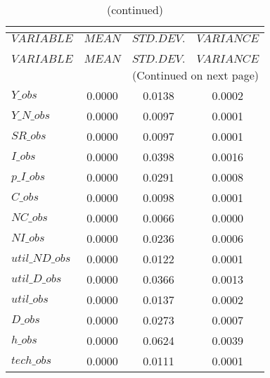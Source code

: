  
\begin{center}
\begin{longtable}{lccc} 
\caption{THEORETICAL MOMENTS}\\
 \label{Table:th_moments}\\
\toprule 
$VARIABLE       $	 & 	 $         MEAN$	 & 	 $    STD. DEV.$	 & 	 $     VARIANCE$\\
\midrule \endfirsthead 
\caption{(continued)}\\
 \toprule \\ 
$VARIABLE       $	 & 	 $         MEAN$	 & 	 $    STD. DEV.$	 & 	 $     VARIANCE$\\
\midrule \endhead 
\midrule \multicolumn{4}{r}{(Continued on next page)} \\ \bottomrule \endfoot 
\bottomrule \endlastfoot 
$Y\_obs         $	 & 	       0.0000	 & 	       0.0138	 & 	       0.0002 \\ 
$Y\_N\_obs      $	 & 	       0.0000	 & 	       0.0097	 & 	       0.0001 \\ 
$SR\_obs        $	 & 	       0.0000	 & 	       0.0097	 & 	       0.0001 \\ 
$I\_obs         $	 & 	       0.0000	 & 	       0.0398	 & 	       0.0016 \\ 
$p\_I\_obs      $	 & 	       0.0000	 & 	       0.0291	 & 	       0.0008 \\ 
$C\_obs         $	 & 	       0.0000	 & 	       0.0098	 & 	       0.0001 \\ 
$NC\_obs        $	 & 	       0.0000	 & 	       0.0066	 & 	       0.0000 \\ 
$NI\_obs        $	 & 	       0.0000	 & 	       0.0236	 & 	       0.0006 \\ 
$util\_ND\_obs  $	 & 	       0.0000	 & 	       0.0122	 & 	       0.0001 \\ 
$util\_D\_obs   $	 & 	       0.0000	 & 	       0.0366	 & 	       0.0013 \\ 
$util\_obs      $	 & 	       0.0000	 & 	       0.0137	 & 	       0.0002 \\ 
$D\_obs         $	 & 	       0.0000	 & 	       0.0273	 & 	       0.0007 \\ 
$h\_obs         $	 & 	       0.0000	 & 	       0.0624	 & 	       0.0039 \\ 
$tech\_obs      $	 & 	       0.0000	 & 	       0.0111	 & 	       0.0001 \\ 
\end{longtable}
 \end{center}
